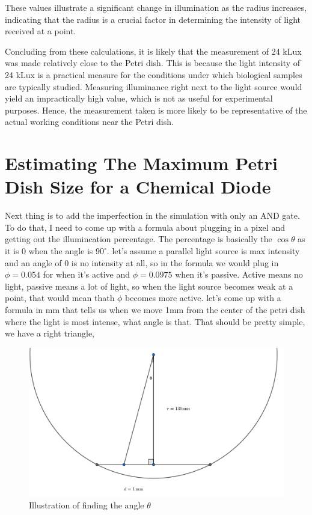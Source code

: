These values illustrate a significant change in illumination as the radius increases, indicating that the radius is a crucial factor in determining the intensity of light received at a point.

Concluding from these calculations, it is likely that the measurement of 24 kLux was made relatively close to the Petri dish. This is because the light intensity of 24 kLux is a practical measure for the conditions under which biological samples are typically studied. Measuring illuminance right next to the light source would yield an impractically high value, which is not as useful for experimental purposes. Hence, the measurement taken is more likely to be representative of the actual working conditions near the Petri dish.


\section{Estimating The Maximum Petri Dish Size for a Chemical Diode \citep{gorecki2003chemical}}


Next thing is to add the imperfection in the simulation with only an AND gate. To do that, I need to come up with a formula about plugging in a pixel and getting out the illumincation percentage. 
The percentage is basically the $\cos\theta$ as it is 0 when the angle is $90^\circ$.
let's assume a parallel light source is max intensity and an angle of 0 is no intensity at all, so in the formula we would plug in $\phi=0.054$ for when it's active and $\phi=0.0975$ when it's passive. Active means no light, passive means a lot of light, so when the light source becomes weak at a point, that would mean thath $\phi$ becomes more active. 
let's come up with a formula in mm that tells us when we move 1mm from the center of the petri dish where the light is most intense, what angle is that. That should be pretty simple, we have a right triangle, 
\begin{figure}
    \centering
    \includegraphics[width=1\linewidth]{geogebra-export (1).png}
    \caption{Illustration of finding the angle $\theta$}
    \label{fig:finding-theta}
\end{figure}

